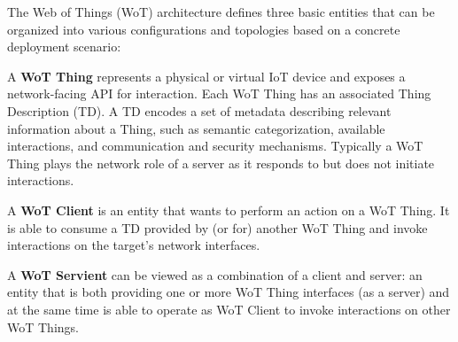 The Web of Things (WoT) architecture\cite{Wot2017arch} defines three basic entities
that can be organized into various configurations and topologies 
based on a concrete deployment scenario:

A \textbf{WoT Thing} represents a physical or virtual IoT device 
        and exposes a network-facing API for interaction.
	Each WoT Thing has an associated Thing Description (TD)\cite{Wot2017td}. 
        A TD encodes a set of metadata describing relevant information about a Thing,
        such as semantic categorization, available interactions, and communication and security mechanisms.
        Typically a WoT Thing plays the network role of a server as it responds to
        but does not initiate interactions.


A \textbf{WoT Client} is an entity that wants to perform an action on a WoT Thing.
	It is able to consume a TD provided by (or for) another WoT Thing and invoke interactions on 
        the target's network interfaces.


A \textbf{WoT Servient} can be viewed as a combination of a client and server:
        an entity that is both providing one or more WoT Thing interfaces (as a server) and
        at the same time is able to operate as WoT Client to invoke interactions on other WoT Things.

